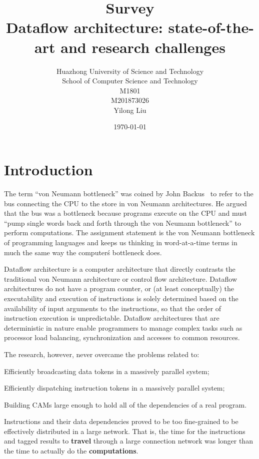 \documentclass[UTF8,12pt,a4paper]{article}
\title{Survey \\ \bigskip \textbf{Dataflow architecture: state-of-the-art and research challenges}}
\author{Huazhong University of Science and Technology\\ School of Computer Science and Technology\\ M1801\\ M201873026\\ Yilong Liu}
\date{\today}
\begin{document}
\maketitle
\newpage


\tableofcontents
\newpage


\section{Introduction}
The term ``von Neumann bottleneck'' was coined by John Backus~\cite{DBLP:journals/cacm/Backus78} to
refer to the bus connecting the CPU to the store in von Neumann architectures.
He argued that the bus was a bottleneck because programs execute on the CPU
and must ``pump single words back and forth through the von Neumann bottleneck'' to perform computations.
The assignment statement is the von Neumann bottleneck of programming languages
and keeps us thinking in word-at-a-time terms in much the same way the computer\'s bottleneck does.

Dataflow architecture is a computer architecture that
directly contrasts the traditional von Neumann architecture
or control flow architecture.
Dataflow architectures do not have a program counter,
or (at least conceptually) the executability
and execution of instructions is solely determined
based on the availability of input arguments to the instructions,
so that the order of instruction execution is unpredictable.
Dataflow architectures that are deterministic in nature
enable programmers to manage complex tasks
such as processor load balancing, synchronization and accesses to common resources.

The research, however, never overcame the problems related to:
\begin{compactitem}
  \item Efficiently broadcasting data tokens in a massively parallel system;
  \item Efficiently dispatching instruction tokens in a massively parallel system;
  \item Building CAMs large enough to hold all of the dependencies of a real program.
\end{compactitem}
Instructions and their data dependencies proved to be too fine-grained to be effectively distributed in a large network.
That is, the time for the instructions and tagged results to \textbf{travel} through a large connection network
was longer than the time to actually do the \textbf{computations}.
\end{document}
